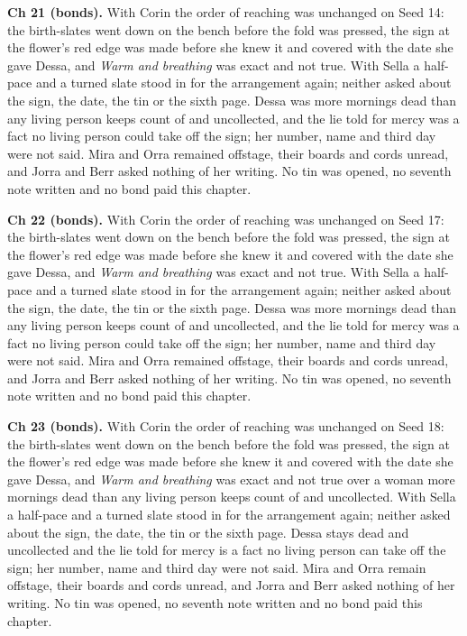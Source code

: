 \documentclass{design/chronicle}
\begin{document}
{\textbf{Ch 21 (bonds).} With Corin the order of reaching was unchanged on Seed 14: the birth-slates went down on the bench before the fold was pressed, the sign at the flower’s red edge was made before she knew it and covered with the date she gave Dessa, and \emph{Warm and breathing} was exact and not true. With Sella a half-pace and a turned slate stood in for the arrangement again; neither asked about the sign, the date, the tin or the sixth page. Dessa was more mornings dead than any living person keeps count of and uncollected, and the lie told for mercy was a fact no living person could take off the sign; her number, name and third day were not said. Mira and Orra remained offstage, their boards and cords unread, and Jorra and Berr asked nothing of her writing. No tin was opened, no seventh note written and no bond paid this chapter.

\textbf{Ch 22 (bonds).} With Corin the order of reaching was unchanged on Seed 17: the birth-slates went down on the bench before the fold was pressed, the sign at the flower’s red edge was made before she knew it and covered with the date she gave Dessa, and \emph{Warm and breathing} was exact and not true. With Sella a half-pace and a turned slate stood in for the arrangement again; neither asked about the sign, the date, the tin or the sixth page. Dessa was more mornings dead than any living person keeps count of and uncollected, and the lie told for mercy was a fact no living person could take off the sign; her number, name and third day were not said. Mira and Orra remained offstage, their boards and cords unread, and Jorra and Berr asked nothing of her writing. No tin was opened, no seventh note written and no bond paid this chapter.

\textbf{Ch 23 (bonds).} With Corin the order of reaching was unchanged on Seed 18: the birth-slates went down on the bench before the fold was pressed, the sign at the flower’s red edge was made before she knew it and covered with the date she gave Dessa, and \emph{Warm and breathing} was exact and not true over a woman more mornings dead than any living person keeps count of and uncollected. With Sella a half-pace and a turned slate stood in for the arrangement again; neither asked about the sign, the date, the tin or the sixth page. Dessa stays dead and uncollected and the lie told for mercy is a fact no living person can take off the sign; her number, name and third day were not said. Mira and Orra remain offstage, their boards and cords unread, and Jorra and Berr asked nothing of her writing. No tin was opened, no seventh note written and no bond paid this chapter.

}
\end{document}
